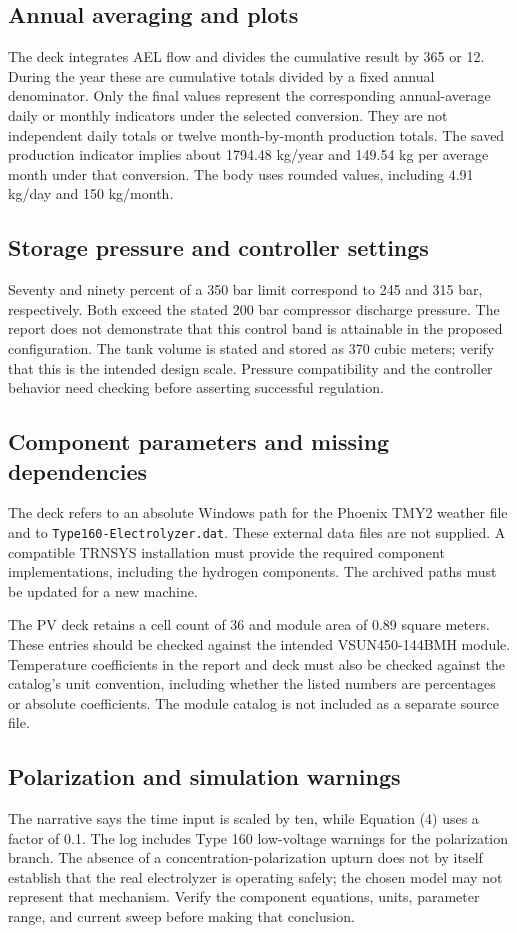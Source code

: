\documentclass[11pt,a4paper]{article}
\begin{document}
\subsection{Annual averaging and plots}
The deck integrates AEL flow and divides the cumulative result by 365 or 12. During the year these are cumulative totals divided by a fixed annual denominator. Only the final values represent the corresponding annual-average daily or monthly indicators under the selected conversion. They are not independent daily totals or twelve month-by-month production totals. The saved production indicator implies about 1794.48 kg/year and 149.54 kg per average month under that conversion. The body uses rounded values, including 4.91 kg/day and 150 kg/month.
\subsection{Storage pressure and controller settings}
Seventy and ninety percent of a 350 bar limit correspond to 245 and 315 bar, respectively. Both exceed the stated 200 bar compressor discharge pressure. The report does not demonstrate that this control band is attainable in the proposed configuration. The tank volume is stated and stored as 370 cubic meters; verify that this is the intended design scale. Pressure compatibility and the controller behavior need checking before asserting successful regulation.
\subsection{Component parameters and missing dependencies}
The deck refers to an absolute Windows path for the Phoenix TMY2 weather file and to \texttt{Type160-Electrolyzer.dat}. These external data files are not supplied. A compatible TRNSYS installation must provide the required component implementations, including the hydrogen components. The archived paths must be updated for a new machine.

The PV deck retains a cell count of 36 and module area of 0.89 square meters. These entries should be checked against the intended VSUN450-144BMH module. Temperature coefficients in the report and deck must also be checked against the catalog's unit convention, including whether the listed numbers are percentages or absolute coefficients. The module catalog is not included as a separate source file.
\subsection{Polarization and simulation warnings}
The narrative says the time input is scaled by ten, while Equation (4) uses a factor of 0.1. The log includes Type 160 low-voltage warnings for the polarization branch. The absence of a concentration-polarization upturn does not by itself establish that the real electrolyzer is operating safely; the chosen model may not represent that mechanism. Verify the component equations, units, parameter range, and current sweep before making that conclusion.
\end{document}
